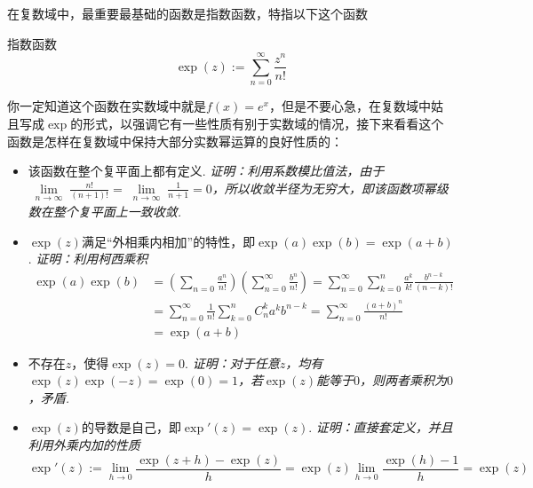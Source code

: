 在复数域中，最重要最基础的函数是指数函数，特指以下这个函数
\begin{definition}{指数函数}
    \[\exp(z) := \sum_{n=0}^{\infty}\frac{z^n}{n!}\]
\end{definition}
你一定知道这个函数在实数域中就是\(f(x)=e^x\)，但是不要心急，在复数域中姑且写成\(\exp\)的形式，以强调它有一些性质有别于实数域的情况，接下来看看这个函数是怎样在复数域中保持大部分实数幂运算的良好性质的：
\begin{itemize}
    \item [(1)] 该函数在整个复平面上都有定义. 
    \newline
    \textit{
        证明：利用系数模比值法，由于\(\displaystyle{\lim \limits_{\substack{n \to \infty}} \frac{n!}{(n+1)!} = \lim \limits_{\substack{n \to \infty}} \frac{1}{n+1} = 0}\)，所以收敛半径为无穷大，即该函数项幂级数在整个复平面上一致收敛.
    }
    \item [(2)] \(\exp(z)\)满足“外相乘内相加”的特性，即\(\exp(a)\exp(b)=\exp(a+b)\).
    \newline
    \textit{
        证明：利用柯西乘积
    }
    \begin{align*}
        \exp(a)\exp(b) &= \left(\sum_{n=0}\frac{a^n}{n!}\right)\left(\sum_{n=0}^{\infty}\frac{b^n}{n!}\right) = \sum_{n=0}^{\infty}\sum_{k=0}^{n}\frac{a^k}{k!}\frac{b^{n-k}}{(n-k)!} \\
        &= \sum_{n=0}^{\infty}\frac{1}{n!}\sum_{k=0}^{n}C_n^ka^kb^{n-k} = \sum_{n=0}^{\infty}\frac{(a+b)^n}{n!} \\
        &= \exp(a+b)
    \end{align*}

    \item [(3)] 不存在\(z\)，使得\(\exp(z)=0\).
    \newline
    \textit{
        证明：对于任意\(z\)，均有\(\exp(z)\exp(-z)=\exp(0)=1\)，若\(\exp(z)\)能等于\(0\)，则两者乘积为\(0\)，矛盾.
    }
    \item [(4)] \(\exp(z)\)的导数是自己，即\(\exp'(z)=\exp(z)\).
    \newline
    \textit{
        证明：直接套定义，并且利用外乘内加的性质
        \[\exp'(z) := \lim_{h \to 0}\frac{\exp(z+h)-\exp(z)}{h} = \exp(z)\lim_{h \to 0}\frac{\exp(h)-1}{h} = \exp(z)\]
    }
\end{itemize}

